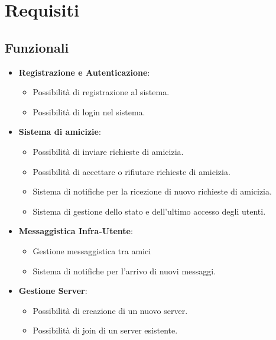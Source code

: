 \chapter{Requisiti}
\section{Funzionali}

\begin{itemize}
    \item \textbf{Registrazione e Autenticazione}:
    \begin{itemize}
        \item Possibilità di registrazione al sistema.
        
        \item Possibilità di login nel sistema.
    \end{itemize}
    \item \textbf{Sistema di amicizie}:
    \begin{itemize}
        \item Possibilità di inviare richieste di amicizia.
        
        \item Possibilità di accettare o rifiutare richieste di amicizia.
        
        \item Sistema di notifiche per la ricezione di nuovo richieste di amicizia.
        
        \item Sistema di gestione dello stato e dell'ultimo accesso degli utenti.
    \end{itemize}
    \item \textbf{Messaggistica Infra-Utente}:
    \begin{itemize}
        \item Gestione messaggistica tra amici
        
        \item Sistema di notifiche per l'arrivo di nuovi messaggi.
    \end{itemize}
    \item \textbf{Gestione Server}:
    \begin{itemize}
        \item Possibilità di creazione di un nuovo server.
        
        \item Possibilità di join di un server esistente.
        

\end{itemize}
\end{itemize}
